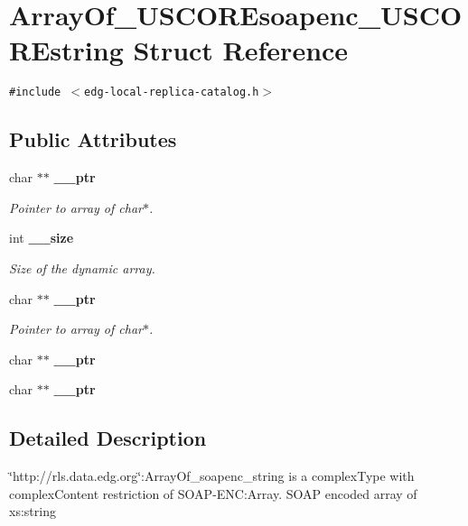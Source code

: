 \section{Array\-Of\_\-USCOREsoapenc\_\-USCOREstring Struct Reference}
\label{structArrayOf__USCOREsoapenc__USCOREstring}
{\tt \#include $<$edg-local-replica-catalog.h$>$}

\subsection*{Public Attributes}
\begin{CompactItemize}
\item 
char $\ast$$\ast$ \bf{\_\-\_\-ptr}\label{structArrayOf__USCOREsoapenc__USCOREstring_5306f8ec842dabbac21aedf30b056515}

\begin{CompactList}\small\item\em Pointer to array of char$\ast$. \item\end{CompactList}\item 
int \bf{\_\-\_\-size}\label{structArrayOf__USCOREsoapenc__USCOREstring_9007546278d85dc65f2b5cf9b0263b7d}

\begin{CompactList}\small\item\em Size of the dynamic array. \item\end{CompactList}\item 
char $\ast$$\ast$ \bf{\_\-\_\-ptr}\label{structArrayOf__USCOREsoapenc__USCOREstring_5306f8ec842dabbac21aedf30b056515}

\begin{CompactList}\small\item\em Pointer to array of char$\ast$. \item\end{CompactList}\item 
char $\ast$$\ast$ \textbf{\_\-\_\-ptr}\label{structArrayOf__USCOREsoapenc__USCOREstring_e9aa8f0aa7837ccc07367a1a3e5a34b3}

\item 
char $\ast$$\ast$ \textbf{\_\-\_\-ptr}\label{structArrayOf__USCOREsoapenc__USCOREstring_e9aa8f0aa7837ccc07367a1a3e5a34b3}

\end{CompactItemize}


\subsection{Detailed Description}
\char`\"{}http://rls.data.edg.org\char`\"{}:Array\-Of\_\-soapenc\_\-string is a complex\-Type with complex\-Content restriction of SOAP-ENC:Array. SOAP encoded array of xs:string 



